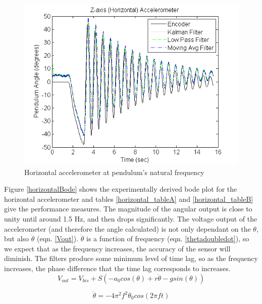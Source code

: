 \documentclass{article}
\theoremstyle{plain}
\theoremstyle{definition}
\theoremstyle{remark}
\begin{document}
\begin{figure}[hbt]
\begin{center}
\includegraphics[width = 12cm]{NormalMass_Horizontal.png}
\caption{Horizontal accelerometer at pendulum's natural frequency}
\label{normal_horizontal}
\end{center}
\end{figure}

Figure \ref{horizontalBode} shows the experimentally derived bode plot for the horizontal accelerometer and tables \ref{horizontal_tableA} and \ref{horizontal_tableB} give the performance measures. The magnitude of the angular output is close to unity until around 1.5 Hz, and then drops significantly. The voltage output of the accelerometer (and therefore the angle calculated) is not only dependant on the $\theta$, but also $\ddot{\theta}$ (eqn. \ref{Vout}).  $\ddot{\theta}$ is a function of frequency (eqn. \ref{thetadoubledot}), so we expect that as the frequency increases, the accuracy of the sensor will diminish. The filters produce some minimum level of time lag, so as the frequency increases, the phase difference that the time lag corresponds to increases. \\

\begin{equation}
V_{out} = V_{bis} + S(-a_0 cos(\theta) + r\ddot{\theta} - g sin(\theta))
\label{Vout}
\end{equation}

\begin{equation}
\ddot{\theta} = -4 \pi^2 f^2 \theta_0 cos(2\pi f t)
\label{thetadoubledot}
\end{equation}
\end{document}
